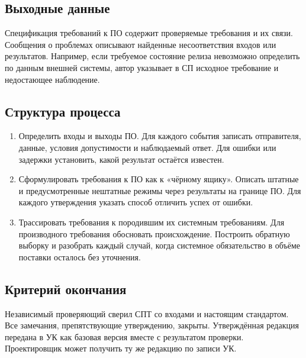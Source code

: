 \documentclass{tpks}
\begin{document}
\subsection{Выходные данные}
Спецификация требований к ПО содержит проверяемые требования и их связи. Сообщения о проблемах описывают найденные несоответствия входов или результатов. Например, если требуемое состояние релиза невозможно определить по данным внешней системы, автор указывает в СП исходное требование и недостающее наблюдение.

\subsection{Структура процесса}
\begin{enumerate}
\item Определить входы и выходы ПО. Для каждого события записать отправителя, данные, условия допустимости и наблюдаемый ответ. Для ошибки или задержки установить, какой результат остаётся известен.
\item Сформулировать требования к ПО как к «чёрному ящику». Описать штатные и предусмотренные нештатные режимы через результаты на границе ПО. Для каждого утверждения указать способ отличить успех от ошибки.
\item Трассировать требования к породившим их системным требованиям. Для производного требования обосновать происхождение. Построить обратную выборку и разобрать каждый случай, когда системное обязательство в объёме поставки осталось без уточнения.
\end{enumerate}

\subsection{Критерий окончания}
Независимый проверяющий сверил СПТ со входами и настоящим стандартом. Все замечания, препятствующие утверждению, закрыты. Утверждённая редакция передана в УК как базовая версия вместе с результатом проверки. Проектировщик может получить ту же редакцию по записи УК.
\end{document}
